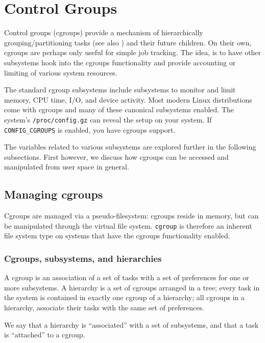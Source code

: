 

\section{Control Groups}

Control groups (cgroups) provide a mechanism of hierarchically
grouping/partitioning tasks (see also
) and their future
children\cite{cgroups-cgroups-since-linux-3.14}. On their own, cgroups are
perhaps only useful for simple job tracking. The idea, is to have other
subsystems hook into the cgroups functionality and provide accounting or
limiting of various system resources.

The standard cgroup subsystems include subsystems to monitor and limit memory,
CPU time, I/O, and device activity. Most modern Linux distributions come with
cgroups and many of these canonical subsystems enabled. The system's
\texttt{/proc/config.gz} can reveal the setup on your system\cite{man-5-proc}.
If \texttt{CONFIG\_CGROUPS} is enabled, you have cgroups support.

The variables related to various subsystems are explored further in the
following subsections. First however, we discuss how cgroups can be accessed
and manipulated from user space in general.

\subsection{Managing cgroups}

Cgroups are managed via a pseudo-filesystem: cgroups reside in memory, but can
be manipulated through the virtual file system.  \texttt{cgroup} is therefore
an inherent file system type on systems that have the cgroups functionality
enabled.

\subsubsection{Cgroups, subsystems, and hierarchies}

A cgroup is an association of a set of tasks with a set of preferences for one
or more subsystems.  A hierarchy is a set of cgroups arranged in a tree; every
task in the system is contained in exactly one cgroup of a hierarchy; all
cgroups in a hierarchy, associate their tasks with the same set of preferences.

We say that a hierarchy is ``associated'' with a set of subsystems, and that a
task is ``attached'' to a cgroup.

